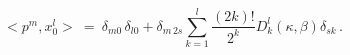 \begin{equation}< p^{m} , x_0^l
> \ = \ \delta_{m 0}\,\delta_{l 0} + \delta_{m\, 2s} \sum_{k=1}^{l}
 \frac{(2k)!}{2^k} D_k^{l}(\kappa , \beta) \delta_{s k}\, .
\label{443}\end{equation} 
